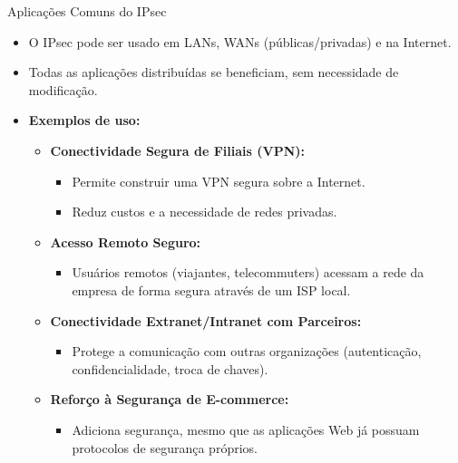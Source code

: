 \begin{frame}{Aplicações Comuns do IPsec}

    \begin{itemize}
        \item O IPsec pode ser usado em LANs, WANs (públicas/privadas) e na Internet.
        \item Todas as aplicações distribuídas se beneficiam, sem necessidade de modificação.

        \item \textbf{Exemplos de uso:}
              \begin{itemize}
                  \item \textbf{Conectividade Segura de Filiais (VPN):}
                        \begin{itemize}
                            \item Permite construir uma VPN segura sobre a Internet.
                            \item Reduz custos e a necessidade de redes privadas.
                        \end{itemize}

                  \item \textbf{Acesso Remoto Seguro:}
                        \begin{itemize}
                            \item Usuários remotos (viajantes, telecommuters) acessam a rede da empresa de forma segura através de um ISP local.
                        \end{itemize}

                  \item \textbf{Conectividade Extranet/Intranet com Parceiros:}
                        \begin{itemize}
                            \item Protege a comunicação com outras organizações (autenticação, confidencialidade, troca de chaves).
                        \end{itemize}

                  \item \textbf{Reforço à Segurança de E-commerce:}
                        \begin{itemize}
                            \item Adiciona segurança, mesmo que as aplicações Web já possuam protocolos de segurança próprios.
                        \end{itemize}
              \end{itemize}
    \end{itemize}
\end{frame}

